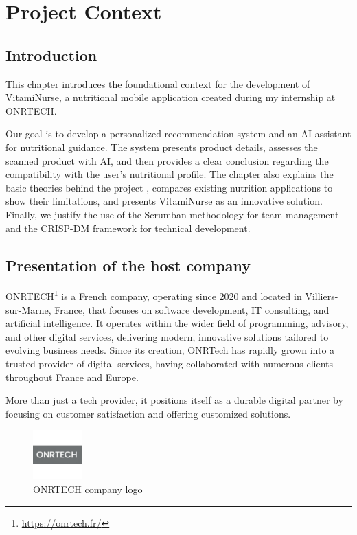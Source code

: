 \chapter{Project Context}
\section*{Introduction}
\par This chapter introduces the foundational context for the development of \mbox{VitamiNurse}, a nutritional mobile application created during my internship at ONRTECH. 

Our goal is to develop a personalized recommendation system and an AI assistant for nutritional guidance. The system presents product details, assesses the scanned product with AI, and then provides a clear conclusion regarding the compatibility with the user’s nutritional profile.
The chapter also explains the basic theories behind the project , compares existing nutrition applications to show their limitations, and presents VitamiNurse as an innovative solution. Finally, we justify the use of the Scrumban methodology for team management and the CRISP-DM framework for technical development.

\section{Presentation of the host company}
\par ONRTECH\footnote{\url{https://onrtech.fr/}} is a French company, operating since 2020 and located in
Villiers-sur-Marne, France, that focuses on software development, IT consulting, and artificial intelligence.
It operates within the wider field of programming, advisory, and other digital services, delivering modern, innovative solutions tailored to evolving business needs. 
Since its creation, ONRTech has rapidly grown into a trusted provider of digital services, having collaborated with numerous
clients throughout France and Europe.

\par More than just a tech provider, it positions itself as a durable digital partner by focusing on customer satisfaction and offering customized solutions.
\begin{figure}[H]
    \centering
    \includegraphics[width=0.17\textwidth]{images/ONRTECH_logo.jpeg}
    \caption{ONRTECH company logo}
    \label{fig:onrtech_logo}
\end{figure}



